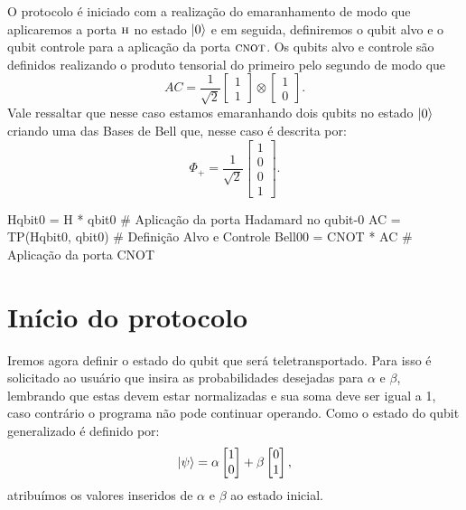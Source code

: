 O protocolo é iniciado com a realização do emaranhamento de modo que aplicaremos a porta \(\operatorname{\textsc{h}}\) no estado \(\ket{0}\) e em seguida, definiremos o qubit alvo e o qubit controle para a aplicação da porta \(\operatorname{\textsc{cnot}}\). Os qubits alvo e controle são definidos realizando o produto tensorial do primeiro pelo segundo de modo que
\[
  AC = \frac{1}{\sqrt{2}} \begin{bmatrix} 1 \\ 1 \end{bmatrix} \otimes \begin{bmatrix} 1 \\ 0 \end{bmatrix}.
\]
Vale ressaltar que nesse caso estamos emaranhando dois qubits no estado \(\ket{0}\) criando uma das Bases de Bell que, nesse caso é descrita por:
\[
  \Phi_+ = \frac{1}{\sqrt{2}} \begin{bmatrix} 1 \\ 0 \\ 0 \\ 1 \end{bmatrix}.
\]

\begin{pycode}
    Hqbit0 = H * qbit0      # Aplicação da porta Hadamard no qubit-0
    AC = TP(Hqbit0, qbit0)  # Definição Alvo e Controle
    Bell00 = CNOT * AC      # Aplicação da porta CNOT
\end{pycode}

\section{Início do protocolo}\label{emaranhamento}

Iremos agora definir o estado do qubit que será teletransportado. Para isso é solicitado ao usuário que insira as probabilidades desejadas para \(\alpha\) e \(\beta\), lembrando que estas devem estar normalizadas e sua soma deve ser igual a 1, caso contrário o programa não pode continuar operando. Como o estado do qubit generalizado é definido por:
\[ \ket{\psi} =
  \alpha \begin{bmatrix} 1 \\ 0 \end{bmatrix} +
  \beta \begin{bmatrix} 0 \\ 1 \end{bmatrix},
\]
atribuímos os valores inseridos de \(\alpha\) e \(\beta\) ao estado inicial.

